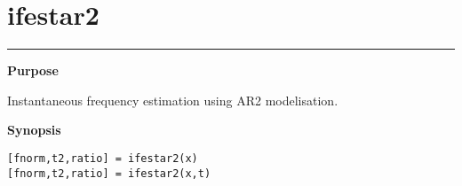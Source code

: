 

\section*{\hspace*{-1.6cm} ifestar2}

\vspace*{-.4cm}
\hspace*{-1.6cm}\rule[0in]{16.5cm}{.02cm}
\vspace*{.2cm}



{\bf \large \sf Purpose}\\
\hspace*{1.5cm}
\begin{minipage}[t]{13.5cm}
Instantaneous frequency estimation using AR2 modelisation. 
\end{minipage}
\vspace*{.5cm}


{\bf \large \sf Synopsis}\\
\hspace*{1.5cm}
\begin{minipage}[t]{13.5cm}
\begin{verbatim}
[fnorm,t2,ratio] = ifestar2(x)
[fnorm,t2,ratio] = ifestar2(x,t)
\end{verbatim}
\end{minipage}
\vspace*{.5cm}



